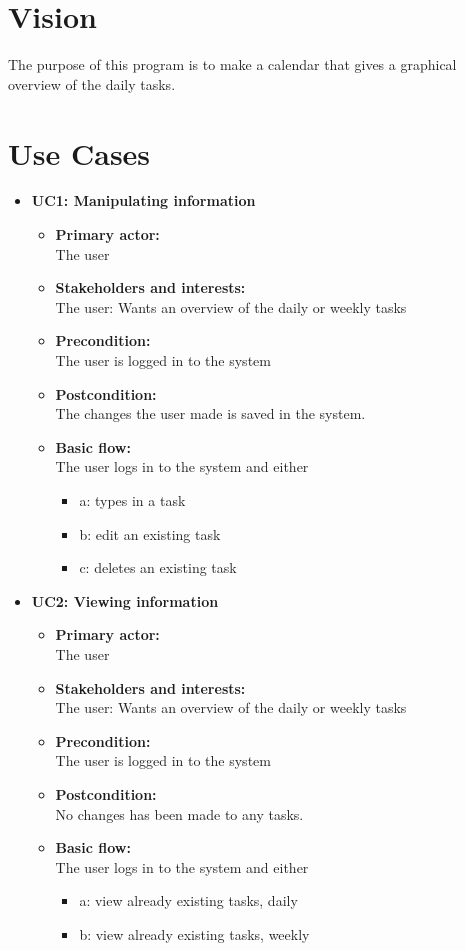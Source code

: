\documentclass[a4paper, 10pt]{article}
\author{Andreas Precht Poulsen & Christian Rostrup Nielsen}
\begin{document}
\section{Vision}
The purpose of this program is to make a calendar that gives a graphical overview of the daily tasks.

\section{Use Cases}

\begin{itemize}
\item \textbf{UC1: Manipulating information}
	\begin{itemize}
	\item \textbf{Primary actor:}
		\\The user
	\item \textbf{Stakeholders and interests:}
		\\The user: Wants an overview of the daily or weekly tasks
	\item \textbf{Precondition:}
		\\The user is logged in to the system
	\item \textbf{Postcondition:}
		\\The changes the user made is saved in the system.
	\item \textbf{Basic flow:}
		\\The user logs in to the system and either
		\begin{itemize}
			\item a: types in a task
			\item b: edit an existing task
			\item c: deletes an existing task
		\end{itemize}
	\end{itemize}

\item \textbf{UC2: Viewing information}
	\begin{itemize}
	\item \textbf{Primary actor:}
		\\The user
	\item \textbf{Stakeholders and interests:}
		\\The user: Wants an overview of the daily or weekly tasks
	\item \textbf{Precondition:}
		\\The user is logged in to the system
	\item \textbf{Postcondition:}
		\\No changes has been made to any tasks.
	\item \textbf{Basic flow:}
		\\The user logs in to the system and either
		\begin{itemize}
			\item a: view already existing tasks, daily
			\item b: view already existing tasks, weekly
		\end{itemize}
	\end{itemize}
\end{itemize}
\end{document}
